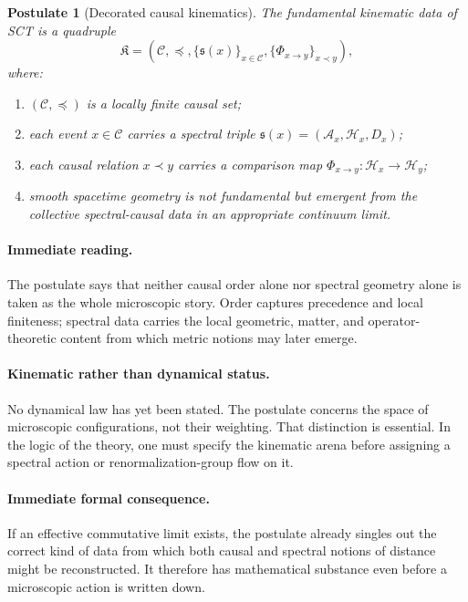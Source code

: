 \documentclass[12pt,a4paper]{article}
\theoremstyle{postulate}
\newtheorem{postulate}{Postulate}
\newcommand{\Hil}{\mathcal{H}}
\newcommand{\Alg}{\mathcal{A}}
\newcommand{\Dirac}{D}
\newcommand{\Causal}{\mathcal{C}}
\newcommand{\Kset}{\mathfrak{K}}
\begin{document}
\begin{postulate}[Decorated causal kinematics]
The fundamental kinematic data of SCT is a quadruple
\begin{equation}
  \Kset
  = \left(
      \Causal,\preceq,
      \{\mathfrak{s}(x)\}_{x\in\Causal},
      \{\Phi_{x\to y}\}_{x\prec y}
    \right),
  \label{eq:kset}
\end{equation}
where:
\begin{enumerate}[label=(\roman*)]
  \item $(\Causal,\preceq)$ is a locally finite causal set;
  \item each event $x\in\Causal$ carries a spectral triple
  $\mathfrak{s}(x)=(\Alg_x,\Hil_x,\Dirac_x)$;
  \item each causal relation $x\prec y$ carries a comparison map
  $\Phi_{x\to y}:\Hil_x\to\Hil_y$;
  \item smooth spacetime geometry is not fundamental but emergent from the
  collective spectral-causal data in an appropriate continuum limit.
\end{enumerate}
\end{postulate}

\paragraph{Immediate reading.}
The postulate says that neither causal order alone nor spectral geometry
alone is taken as the whole microscopic story.  Order captures precedence and
local finiteness; spectral data carries the local geometric, matter, and
operator-theoretic content from which metric notions may later emerge.

\paragraph{Kinematic rather than dynamical status.}
No dynamical law has yet been stated.  The postulate concerns the space of
microscopic configurations, not their weighting.  That distinction is
essential.  In the logic of the theory, one must specify the kinematic arena
before assigning a spectral action or renormalization-group flow on it.

\paragraph{Immediate formal consequence.}
If an effective commutative limit exists, the postulate already singles out
the correct kind of data from which both causal and spectral notions of
distance might be reconstructed.  It therefore has mathematical substance
even before a microscopic action is written down.
\end{document}
